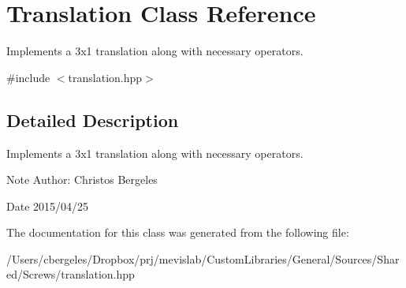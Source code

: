 \hypertarget{class_translation}{\section{Translation Class Reference}
\label{class_translation}
}


Implements a 3x1 translation along with necessary operators.  




{\ttfamily \#include $<$translation.\+hpp$>$}



\subsection{Detailed Description}
Implements a 3x1 translation along with necessary operators. 

\begin{DoxyNote}{Note}
Author\+: Christos Bergeles 
\end{DoxyNote}
\begin{DoxyDate}{Date}
2015/04/25 
\end{DoxyDate}


The documentation for this class was generated from the following file\+:\begin{DoxyCompactItemize}
\item 
/\+Users/cbergeles/\+Dropbox/prj/mevislab/\+Custom\+Libraries/\+General/\+Sources/\+Shared/\+Screws/translation.\+hpp\end{DoxyCompactItemize}
